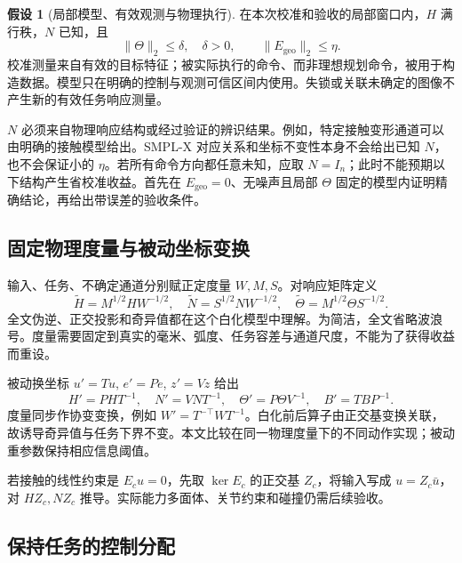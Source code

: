 \documentclass[11pt,a4paper]{article}
\numberwithin{equation}{section}
\theoremstyle{definition}
\newtheorem{assumption}[theorem]{假设}
\begin{document}
\begin{assumption}[局部模型、有效观测与物理执行]
\label{ass:cal-model}
在本次校准和验收的局部窗口内，$H$ 满行秩，$N$ 已知，且
\begin{equation}
  \|\Theta\|_2\le\delta,\quad\delta>0,\qquad
  \|E_{\mathrm{geo}}\|_2\le\eta .
\end{equation}
校准测量来自有效的目标特征；被实际执行的命令、而非理想规划命令，被用于构造数据。模型只在明确的控制与观测可信区间内使用。失锁或关联未确定的图像不产生新的有效任务响应测量。
\end{assumption}

$N$ 必须来自物理响应结构或经过验证的辨识结果。例如，特定接触变形通道可以由明确的接触模型给出。SMPL-X 对应关系和坐标不变性本身不会给出已知 $N$，也不会保证小的 $\eta$。若所有命令方向都任意未知，应取 $N=I_n$；此时不能预期以下结构产生省校准收益。首先在 $E_{\mathrm{geo}}=0$、无噪声且局部 $\Theta$ 固定的模型内证明精确结论，再给出带误差的验收条件。

\subsection{固定物理度量与被动坐标变换}

输入、任务、不确定通道分别赋正定度量 $W,M,S$。对响应矩阵定义
\begin{equation}
 \widetilde H=M^{1/2}HW^{-1/2},\quad
 \widetilde N=S^{1/2}NW^{-1/2},\quad
 \widetilde\Theta=M^{1/2}\Theta S^{-1/2}.
\end{equation}
全文伪逆、正交投影和奇异值都在这个白化模型中理解。为简洁，全文省略波浪号。度量需要固定到真实的毫米、弧度、任务容差与通道尺度，不能为了获得收益而重设。

被动换坐标 $u'=Tu$, $e'=Pe$, $z'=Vz$ 给出
\begin{equation}
 H'=PHT^{-1},\quad N'=VNT^{-1},\quad
 \Theta'=P\Theta V^{-1},\quad B'=TBP^{-1}.
\end{equation}
度量同步作协变变换，例如 $W'=T^{-\top}WT^{-1}$。白化前后算子由正交基变换关联，故诱导奇异值与任务下界不变。本文比较在同一物理度量下的不同动作实现；被动重参数保持相应信息阈值。

若接触的线性约束是 $E_cu=0$，先取 $\ker E_c$ 的正交基 $Z_c$，将输入写成 $u=Z_c\bar u$，对 $HZ_c,NZ_c$ 推导。实际能力多面体、关节约束和碰撞仍需后续验收。

\subsection{保持任务的控制分配}
\end{document}
